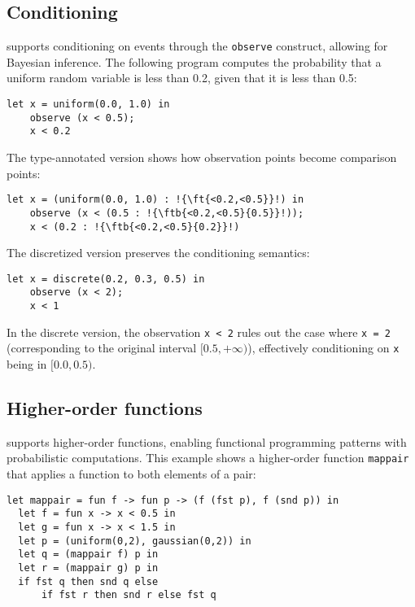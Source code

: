 \subsection{Conditioning}

\Slice{} supports conditioning on events through the \texttt{observe} construct, allowing for Bayesian inference. The following program computes the probability that a uniform random variable is less than 0.2, given that it is less than 0.5:

\begin{lstlisting}[aboveskip=1em,belowskip=1em,escapechar=!]
    let x = uniform(0.0, 1.0) in
    observe (x < 0.5);
    x < 0.2
\end{lstlisting}

\noindent The type-annotated version shows how observation points become comparison points:

\begin{lstlisting}[aboveskip=1em,belowskip=1em,escapechar=!]
    let x = (uniform(0.0, 1.0) : !{\ft{<0.2,<0.5}}!) in
    observe (x < (0.5 : !{\ftb{<0.2,<0.5}{0.5}}!));
    x < (0.2 : !{\ftb{<0.2,<0.5}{0.2}}!)
\end{lstlisting}

\noindent The discretized version preserves the conditioning semantics:

\begin{lstlisting}[aboveskip=1em,belowskip=1em]
    let x = discrete(0.2, 0.3, 0.5) in
    observe (x < 2);
    x < 1
\end{lstlisting}

\noindent In the discrete version, the observation \texttt{x < 2} rules out the case where \texttt{x = 2} (corresponding to the original interval $[0.5, +\infty)$), effectively conditioning on \texttt{x} being in $[0.0, 0.5)$.

\subsection{Higher-order functions}

\Slice{} supports higher-order functions, enabling functional programming patterns with probabilistic computations. This example shows a higher-order function \texttt{mappair} that applies a function to both elements of a pair:

\begin{lstlisting}[aboveskip=1em,belowskip=1em,escapechar=!]
  let mappair = fun f -> fun p -> (f (fst p), f (snd p)) in
  let f = fun x -> x < 0.5 in
  let g = fun x -> x < 1.5 in
  let p = (uniform(0,2), gaussian(0,2)) in
  let q = (mappair f) p in
  let r = (mappair g) p in
  if fst q then snd q else 
      if fst r then snd r else fst q
\end{lstlisting}

